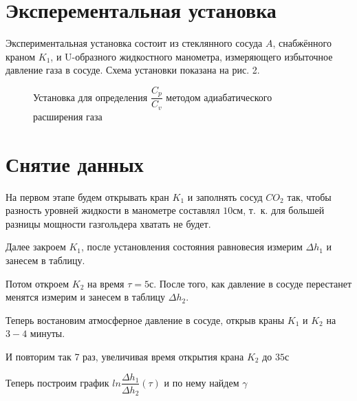\section{Эксперементальная установка}

Экспериментальная установка состоит из стеклянного сосуда $A$, снабжённого краном $K_1$, и U-образного жидкостного манометра, измеряющего избыточное давление газа в сосуде. Схема установки показана на рис. 2.

\begin{figure}[h]
	\caption{Установка для определения $\dfrac{C_p}{C_v}$ методом адиабатического расширения газа}
\end{figure}

\section{Снятие данных}

На первом этапе будем открывать кран $K_1$ и заполнять сосуд $CO_2$ так, чтобы разность уровней жидкости в манометре составлял $10 \text{см}$, т.~к. для большей разницы мощности газгольдера хватать не будет.

Далее закроем $K_1$, после установления состояния равновесия измерим $\Delta h_1$ и занесем в таблицу.

Потом откроем $K_2$ на время $\tau = 5 \text{с}$. После того, как давление в сосуде перестанет менятся измерим и занесем в таблицу $\Delta h_2$.

Теперь востановим атмосферное давление в сосуде, открыв краны $K_1$ и $K_2$ на $3-4$ минуты.

И повторим так 7 раз, увеличивая время открытия крана $K_2$ до $35 \text{с}$

Теперь построим график $ln\dfrac{\Delta h_1}{\Delta h_2}(\tau)$ и по нему найдем $\gamma$

